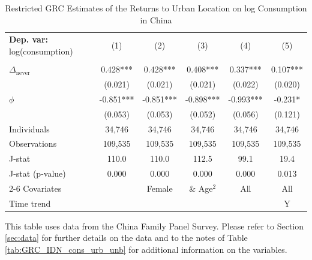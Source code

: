 \begin{table}[htbp] \centering \begin{threeparttable}
 \caption{Restricted GRC Estimates of the Returns to Urban Location on log Consumption in China} 
 \label{tab:GRC_CHN_cons_urb_unb} 
\begin{tabular}{l ccccc} \toprule  \textbf{Dep. var:}  log(consumption) 
                    &\multicolumn{1}{c}{(1)}   &\multicolumn{1}{c}{(2)}   &\multicolumn{1}{c}{(3)}   &\multicolumn{1}{c}{(4)}   &\multicolumn{1}{c}{(5)}   \\
                    &               &               &               &               &               \\
\addlinespace
$\Delta_{\text{never}}$&    0.428***&       0.428***&       0.408***&       0.337***&       0.107***\\
                    &     (0.021)   &     (0.021)   &     (0.021)   &     (0.022)   &     (0.020)   \\
\addlinespace
$\phi$              &      -0.851***&      -0.851***&      -0.898***&      -0.993***&      -0.231*  \\
                    &     (0.053)   &     (0.053)   &     (0.052)   &     (0.056)   &     (0.121)   \\
\addlinespace
Individuals         &      34,746   &      34,746   &      34,746   &      34,746   &      34,746   \\
Observations        &     109,535   &     109,535   &     109,535   &     109,535   &     109,535   \\
J-stat              &       110.0   &       110.0   &       112.5   &        99.1   &        19.4   \\
J-stat (p-value)    &       0.000   &       0.000   &       0.000   &       0.000   &       0.013   \\
\cmidrule{2-6} Covariates & & Female & \& Age$^2$ & All & All  \\ Time trend & & & & & Y \\ \bottomrule \end{tabular} \begin{tablenotes} \footnotesize \item{This table uses data from the China Family Panel Survey. Please refer to Section \ref{sec:data} for further details on the data and to the notes of Table \ref{tab:GRC_IDN_cons_urb_unb} for additional information on the variables. 
}
\end{tablenotes}
\end{threeparttable}
\end{table}
